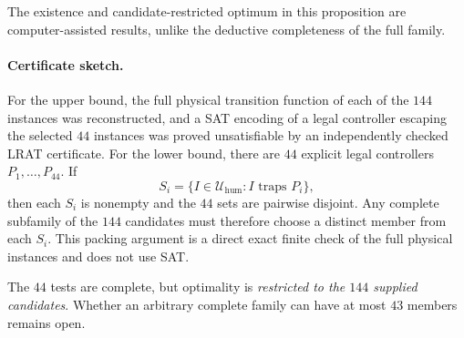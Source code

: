 The existence and candidate-restricted optimum in this proposition are
computer-assisted results, unlike the deductive completeness of the full family.
\paragraph{Certificate sketch.}
For the upper bound, the full physical transition function of each of the $144$
instances was reconstructed, and a SAT encoding of a legal controller escaping the
selected $44$ instances was proved unsatisfiable by an independently checked LRAT
certificate.  For the lower bound, there are $44$ explicit legal controllers
$P_1,\ldots,P_{44}$.  If
\[
  S_i=\{I\in\mathcal U_{\mathrm{hum}}: I\text{ traps }P_i\},
\]
then each $S_i$ is nonempty and the $44$ sets are pairwise disjoint.  Any complete
subfamily of the $144$ candidates must therefore choose a distinct member from each
$S_i$.  This packing argument is a direct exact finite check of the full physical
instances and does not use SAT.

The $44$ tests are complete, but optimality is \emph{restricted to the $144$
supplied candidates}. Whether an arbitrary complete family can have at most $43$
members remains open.
